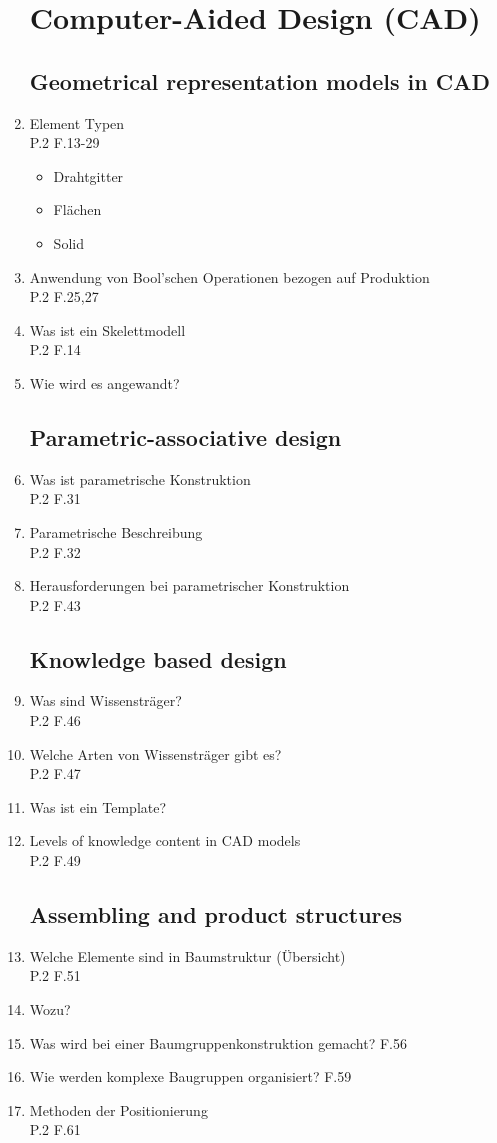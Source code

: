 \documentclass[10pt,a4paper,fleqn]{article}
\begin{document}
\begin{enumerate}
\section{Computer-Aided Design (CAD)}
\subsection{Geometrical representation models in CAD}
	\item Element Typen\\
		P.2 F.13-29
	 	\begin{itemize}
	 		\item Drahtgitter
	 		\item Flächen
	 		\item Solid
	 	\end{itemize}
	 \item Anwendung von Bool'schen Operationen bezogen auf Produktion\\
	 	P.2 F.25,27
	 \item Was ist ein Skelettmodell\\
	 	P.2 F.14
	 \item Wie wird es angewandt?
\subsection{Parametric-associative design}
	 \item Was ist parametrische Konstruktion\\
	 	P.2 F.31
	 \item Parametrische Beschreibung\\
	 	P.2 F.32
	 \item Herausforderungen bei parametrischer Konstruktion\\
	 	P.2 F.43
\subsection{Knowledge based design}
	\item Was sind Wissensträger?\\
		P.2 F.46
	\item Welche Arten von Wissensträger gibt es?\\
		P.2 F.47
	\item Was ist ein Template?
	\item Levels of knowledge content in CAD models\\
		P.2 F.49
\subsection{Assembling and product structures}
	\item Welche Elemente sind in Baumstruktur (Übersicht)\\
		P.2 F.51
	\item Wozu?
	\item Was wird bei einer Baumgruppenkonstruktion gemacht? F.56
	\item Wie werden komplexe Baugruppen organisiert? F.59
	\item Methoden der Positionierung\\
		P.2 F.61

\end{enumerate}
\end{document}
